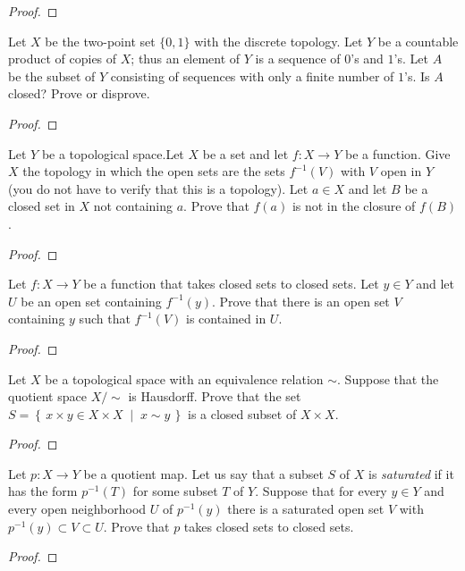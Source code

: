 \begin{proof}
\end{proof}
\begin{problem}
Let $X$ be the two-point set $\{0,1\}$ with the discrete
topology. Let $Y$ be a countable product of copies of $X$; thus
an element of $Y$ is a sequence of $0$'s and $1$'s. Let $A$ be
the subset of $Y$ consisting of sequences with only a finite
number of $1$'s. Is $A$ closed? Prove or disprove.
\end{problem}
\begin{proof}
\end{proof}
\begin{problem}
Let $Y$ be a topological space.Let $X$ be a set and let $f\colon
X\to Y$ be a function. Give $X$ the topology in which the open
sets are the sets $f^{-1}(V)$ with $V$ open in $Y$ (you do not
have to verify that this is a topology). Let $a\in X$ and let $B$
be a closed set in $X$ not containing $a$. Prove that $f(a)$ is
not in the closure of $f(B)$.
\end{problem}
\begin{proof}
\end{proof}
\begin{problem}
Let $f\colon X\to Y$ be a function that takes closed sets to
closed sets. Let $y\in Y$ and let $U$ be an open set containing
$f^{-1}(y)$. Prove that there is an open set $V$ containing $y$
such that $f^{-1}(V)$ is contained in $U$.
\end{problem}
\begin{proof}
\end{proof}
\begin{problem}
Let $X$ be a topological space with an equivalence relation
$\sim$. Suppose that the quotient space $X/{\sim}$ is
Hausdorff. Prove that the set $S=\left\{\,x\times y\in X\times
  X\;\middle|\;x\sim y\,\right\}$ is a closed subset of $X\times
X$.
\end{problem}
\begin{proof}
\end{proof}
\begin{problem}
Let $p\colon X\to Y$ be a quotient map. Let us say that a subset
$S$ of $X$ is \emph{saturated} if it has the form $p^{-1}(T)$ for
some subset $T$ of $Y$. Suppose that for every $y\in Y$ and every
open neighborhood $U$ of $p^{-1}(y)$ there is a saturated open
set $V$ with $p^{-1}(y)\subset V\subset U$. Prove that $p$ takes
closed sets to closed sets.
\end{problem}
\begin{proof}
\end{proof}
